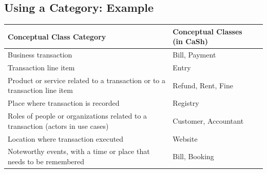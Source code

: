 \subsection{Using a Category: Example}
\begin{table}[H]
    \centering
    \renewcommand{\arraystretch}{1.2}
    \begin{tabular}{lll}
        \toprule
        Conceptual Class Category & Conceptual Classes (in CaSh) \\
        \midrule
        Business transaction & Bill, Payment\\
        Transaction line item & Entry\\
        Product or service related to a transaction or to a transaction line item & Refund, Rent, Fine\\
        Place where transaction is recorded & Registry\\
        Roles of people or organizations related to a transaction (actors in use cases) & Customer, Accountant\\
        Location where transaction executed & Website\\
        Noteworthy events, with a time or place that needs to be remembered & Bill, Booking\\
        \bottomrule
    \end{tabular}
\end{table}
